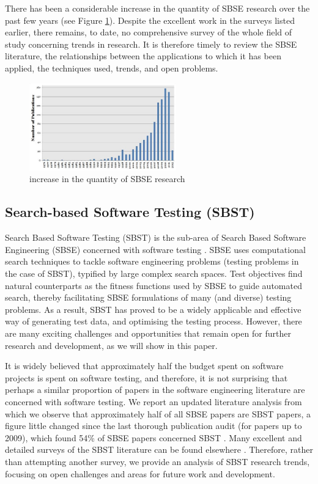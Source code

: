 \documentclass[conference]{IEEEtran}
\begin{document}
There has been a considerable increase in the quantity of SBSE research over the past
few years (see Figure \ref{fig-increaseInSBSE}). Despite the excellent work in the surveys listed earlier, there
remains, to date, no comprehensive survey of the whole field of study concerning trends
in research. It is therefore timely to review the SBSE literature, the relationships
between the applications to which it has been applied, the techniques used, trends,
and open problems.

\begin{figure}[!t]
    \centering
    \includegraphics[width=2.5in]{increaseInTheQuantityOfSBSEResearch.jpg}
    \caption{increase in the quantity of SBSE research} 
    \label{fig-increaseInSBSE}
\end{figure}



\subsection{Search-based Software Testing (SBST)}
Search Based Software Testing (SBST) is the sub-area of
Search Based Software Engineering (SBSE) concerned with
software testing \cite{AFZAL2009957, doi:10.1002/stvr.294}. 
SBSE uses computational search
techniques to tackle software engineering problems (testing
problems in the case of SBST), typified by large complex
search spaces\cite{Mark2010Search}. Test objectives find natural counterparts
as the fitness functions used by SBSE to guide automated
search, thereby facilitating SBSE formulations of many (and
diverse) testing problems. As a result, SBST has proved to
be a widely applicable and effective way of generating test
data, and optimising the testing process. However, there are
many exciting challenges and opportunities that remain open
for further research and development, as we will show in this
paper\cite{7102580}.

It is widely believed that approximately half the budget
spent on software projects is spent on software testing, and
therefore, it is not surprising that perhaps a similar proportion
of papers in the software engineering literature are concerned
with software testing. We report an updated literature analysis
from which we observe that approximately half of all SBSE
papers are SBST papers, a figure little changed since the last
thorough publication audit (for papers up to 2009), which
found 54\% of SBSE papers concerned SBST \cite{10.1145/2379776.2379787}. Many
excellent and detailed surveys of the SBST literature can be
found elsewhere \cite{AFZAL2009957, 5210118, 5210119, doi:10.1002/stvr.294, doi:10.1002/stvr.430}. 
Therefore, rather
than attempting another survey, we provide an analysis of
SBST research trends, focusing on open challenges and areas
for future work and development.
\end{document}
